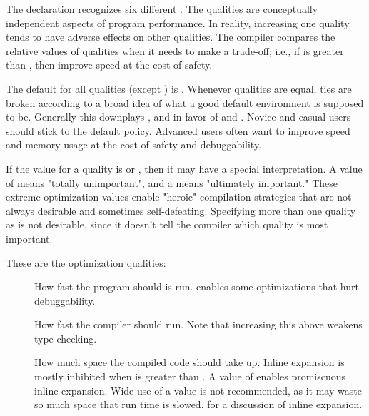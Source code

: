 {The  declaration recognizes six different .  The
qualities are conceptually independent aspects of program performance.  In
reality, increasing one quality tends to have adverse effects on other
qualities.  The compiler compares the relative values of qualities when it
needs to make a trade-off; i.e., if  is greater than , then
improve speed at the cost of safety.

The default for all qualities (except ) is .  Whenever
qualities are equal, ties are broken according to a broad idea of what a good
default environment is supposed to be.  Generally this downplays ,
 and  in favor of  and .
Novice and casual users should stick to the default policy.  Advanced users
often want to improve speed and memory usage at the cost of safety and
debuggability.

If the value for a quality is  or , then it may have a special
interpretation.  A value of  means "totally unimportant", and a 
means "ultimately important."  These extreme optimization values enable
"heroic" compilation strategies that are not always desirable and sometimes
self-defeating.  Specifying more than one quality as  is not desirable,
since it doesn't tell the compiler which quality is most important.


These are the optimization qualities:
\begin{description}

\item[]
How fast the program should is run.
 enables some optimizations that hurt debuggability.

\item[]
How fast the compiler should
run.  Note that increasing this above  weakens type checking.

\item[]
How much space the compiled code should take
up.  Inline expansion is mostly inhibited when  is greater than
.  A value of  enables promiscuous inline expansion.  Wide use of
a  value is not recommended, as it may waste so much space that run time
is slowed.   for a discussion of inline
expansion.


\end{description}}
